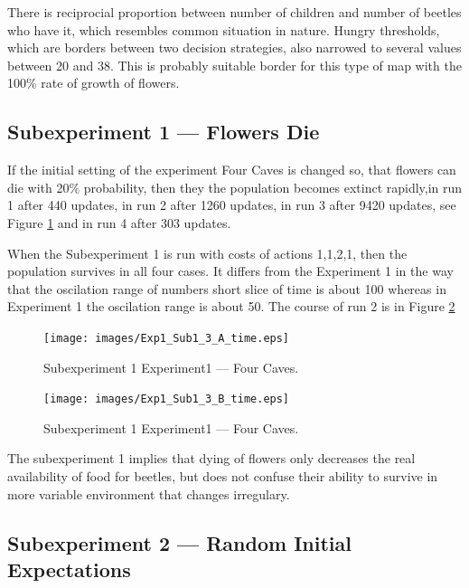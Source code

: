 \documentclass[a4paper,12pt]{report}
\begin{document}
There is reciprocial proportion between number of children and number of beetles who have it, which resembles common situation in nature. Hungry thresholds, which are borders between two decision strategies, also narrowed to several values between 20 and 38. This is probably suitable border for this type of map with the 100\% rate of growth of flowers.

\subsection{Subexperiment 1 --- Flowers Die}

If the initial setting of the experiment Four Caves is changed so, that flowers can die with 20\% probability, then they the population becomes extinct rapidly,in run 1 after 440 updates, in run 2 after 1260 updates, in run 3 after 9420 updates, see Figure \ref{img.Exp1_Sub1_3_A_time} and in run 4 after 303 updates. 

When the Subexperiment 1 is run with costs of actions 1,1,2,1, then the population survives in all four cases. It differs from the Experiment 1 in the way that the oscilation range of numbers short slice of time is about 100 whereas in Experiment 1 the oscilation range is about 50. The course of run 2 is in Figure \ref{img.Exp1_Sub1_3_B_time}

\begin{figure}
\begin{center}
  \texttt{[image: images/Exp1\_Sub1\_3\_A\_time.eps]}
  \caption{Subexperiment 1 Experiment1 --- Four Caves.}
  \label{img.Exp1_Sub1_3_A_time}
\end{center}
\end{figure}

\begin{figure}
\begin{center}
  \texttt{[image: images/Exp1\_Sub1\_3\_B\_time.eps]}
  \caption{Subexperiment 1 Experiment1 --- Four Caves.}
  \label{img.Exp1_Sub1_3_B_time}
\end{center}
\end{figure}

The subexperiment 1 implies that dying of flowers only decreases the real availability of food for beetles, but does not confuse their ability to survive in more variable environment that changes irregulary.

\subsection{Subexperiment 2 --- Random Initial Expectations}
\end{document}
